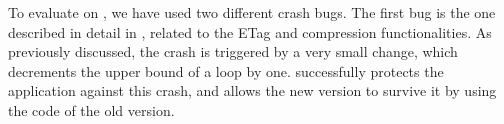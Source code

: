 To evaluate \mx on \lighttpd, we have used two different crash bugs.
The first bug is the one described in detail in
, related to the ETag and compression
functionalities.  As previously discussed, the crash is triggered by a
very small change, which decrements the upper bound of a 
loop by one.  \mx successfully protects the application against this
crash, and allows the new version to survive it by using the code of
the old version.










